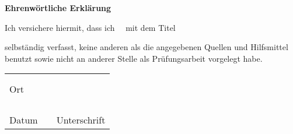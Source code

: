 \pagestyle{plain}


\textbf{{\Large Ehrenwörtliche Erklärung}}
\vspace{2cm}

{\newcommand{\DocumentArticle}{meinen}}
{
	{\newcommand{\DocumentWord}{meine}}
	{
		{\newcommand{\DocumentArticle}{meine}}
		{
			{\newcommand{\DocumentArticle}{meine}}
			{\newcommand{\DocumentArticle}{meine/n}}
		}
	}
}

Ich versichere hiermit, dass ich \DocumentArticle\ \DocumentType \ mit dem Titel
\vspace{1cm}

\textbf{\Titel}

\vspace{1cm}
selbständig verfasst, keine anderen als die angegebenen Quellen und Hilfsmittel benutzt
sowie nicht an anderer Stelle als Prüfungsarbeit vorgelegt habe.
\vfill

\begin{table*}[hp]
	\centering
	\begin{tabular}{L{6cm}L{2cm}L{6cm}}
		      &   &              \\
		      &   &              \\ 
		Ort   &                  \\
		      &   &              \\
		      &   &              \\
		      &   &              \\
		      &   &              \\  
		Datum &   & Unterschrift \\
	\end{tabular}
\end{table*}
